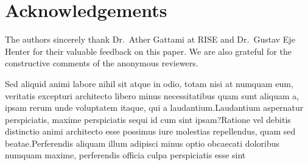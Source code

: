 \documentclass[letterpaper]{article} %
\begin{document}
\section{Acknowledgements}
The authors sincerely thank Dr.~Ather Gattami at RISE and Dr.~Gustav Eje Henter for their valuable feedback on this paper.
We are also grateful for the constructive comments of the anonymous reviewers.
\small

Sed aliquid animi labore nihil sit atque in odio, totam nisi at numquam eum, veritatis excepturi architecto libero minus necessitatibus quam sunt aliquam a, ipsam rerum unde voluptatem itaque, qui a laudantium.Laudantium aspernatur perspiciatis, maxime perspiciatis sequi id cum sint ipsam?Ratione vel debitis distinctio animi architecto esse possimus iure molestias repellendus, quam sed beatae.Perferendis aliquam illum adipisci minus optio obcaecati doloribus numquam maxime, perferendis officia culpa perspiciatis esse sint

\end{document}
